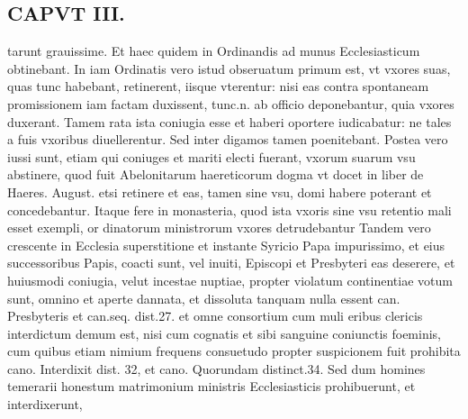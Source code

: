 \documentclass{article}
\begin{document}
\begin{pages}
\section*{CAPVT  III. }
\marginpar{[ p.117 ]}\pstart tarunt grauissime. Et haec quidem in Ordinandis ad munus Ecclesiasticum obtinebant. In iam Ordinatis vero istud obseruatum primum est, vt vxores suas, quas tunc habebant, retinerent, iisque vterentur: nisi eas contra spontaneam promissionem iam factam duxissent, tunc.n. ab officio deponebantur, quia vxores duxerant. Tamem rata ista coniugia esse et haberi oportere iudicabatur: ne tales a fuis vxoribus diuellerentur. Sed inter digamos tamen poenitebant. Postea vero iussi sunt, etiam qui coniuges et mariti electi fuerant, vxorum suarum vsu abstinere, quod fuit Abelonitarum haereticorum dogma vt docet in liber  de Haeres. August. etsi retinere et eas, tamen sine vsu, domi habere poterant et concedebantur. Itaque fere in monasteria, quod ista vxoris sine vsu retentio mali esset exempli, or dinatorum ministrorum vxores detrudebantur Tandem vero crescente in Ecclesia superstitione et instante Syricio Papa impurissimo, et eius successoribus Papis, coacti sunt, vel inuiti, Episcopi et Presbyteri eas deserere, et huiusmodi coniugia, velut incestae nuptiae, propter violatum continentiae votum sunt, omnino et aperte dannata, et dissoluta tanquam nulla essent can. Presbyteris et can.seq. dist.27. et omne consortium cum muli eribus clericis interdictum demum est, nisi cum cognatis et sibi sanguine coniunctis foeminis, cum quibus etiam nimium frequens consuetudo propter suspicionem fuit prohibita cano. Interdixit dist. 32, et cano. Quorundam distinct.34. Sed dum homines temerarii honestum matrimonium ministris Ecclesiasticis prohibuerunt, et interdixerunt,  \pend

\end{pages}
\end{document}

